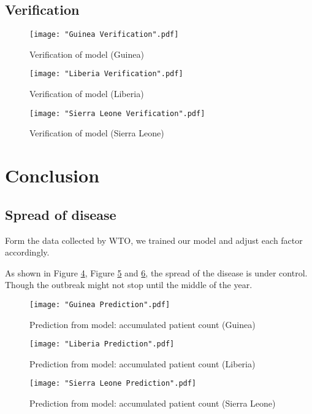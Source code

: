 \documentclass[11pt]{article}
\begin{document}
\subsection{Verification}

\begin{figure}[htbp]
\centerline{\texttt{[image: "Guinea Verification".pdf]}}
\caption{Verification of model (Guinea)}
\label{GuineaVerification}
\end{figure}

\begin{figure}[htbp]
\centerline{\texttt{[image: "Liberia Verification".pdf]}}
\caption{Verification of model (Liberia)}
\label{LiberiaVerification}
\end{figure}

\begin{figure}[htbp]
\centerline{\texttt{[image: "Sierra Leone Verification".pdf]}}
\caption{Verification of model (Sierra Leone)}
\label{SierraLeoneVerification}
\end{figure}


\section{Conclusion}

\subsection{Spread of disease}

Form the data collected by WTO, we trained our model and adjust each factor accordingly.

As shown in Figure \ref{GuineaPrediction}, Figure \ref{LiberiaPrediction} and \ref{SierraLeonePrediction}, the spread of the disease is under control. Though the outbreak might not stop until the middle of the year.

\begin{figure}[htbp]
\centerline{\texttt{[image: "Guinea Prediction".pdf]}}
\caption{Prediction from model: accumulated patient count (Guinea)}
\label{GuineaPrediction}
\end{figure}

\begin{figure}[htbp]
\centerline{\texttt{[image: "Liberia Prediction".pdf]}}
\caption{Prediction from model: accumulated patient count (Liberia)}
\label{LiberiaPrediction}
\end{figure}

\begin{figure}[htbp]
\centerline{\texttt{[image: "Sierra Leone Prediction".pdf]}}
\caption{Prediction from model: accumulated patient count (Sierra Leone)}
\label{SierraLeonePrediction}
\end{figure}
\end{document}
